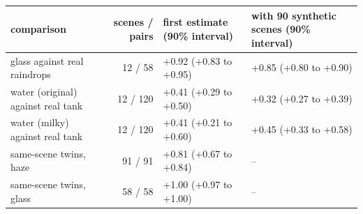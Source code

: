 \begin{tabular}{lrll}
\toprule
comparison & scenes / pairs & first estimate (90\% interval) & with 90 synthetic scenes (90\% interval) \\
\midrule
glass against real raindrops & 12 / 58 & +0.92 (+0.83 to +0.95) & +0.85 (+0.80 to +0.90) \\
water (original) against real tank & 12 / 120 & +0.41 (+0.29 to +0.50) & +0.32 (+0.27 to +0.39) \\
water (milky) against real tank & 12 / 120 & +0.41 (+0.21 to +0.60) & +0.45 (+0.33 to +0.58) \\
same-scene twins, haze & 91 / 91 & +0.81 (+0.67 to +0.84) & -- \\
same-scene twins, glass & 58 / 58 & +1.00 (+0.97 to +1.00) & -- \\
\bottomrule
\end{tabular}
